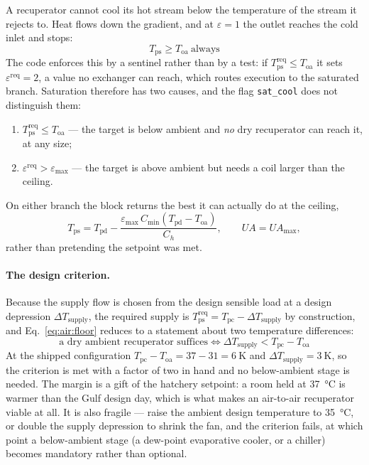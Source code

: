 \documentclass[11pt]{article}
\providecommand{\celsius}{\degreeCelsius}
\newcommand{\UA}{\ensuremath{U\!A}}
\begin{document}
A recuperator cannot cool its hot stream below the temperature of the stream it
rejects to. Heat flows down the gradient, and at $\varepsilon=1$ the outlet
reaches the cold inlet and stops:
\begin{equation}
\boxed{\;T_{\mathrm{ps}} \ge T_{\mathrm{oa}}\ \text{always}\;}
\label{eq:air:floor}
\end{equation}
The code enforces this by a sentinel rather than by a test: if
$T_{\mathrm{ps}}^{\mathrm{req}}\le T_{\mathrm{oa}}$ it sets
$\varepsilon^{\mathrm{req}}=2$, a value no exchanger can reach, which routes
execution to the saturated branch. Saturation therefore has two causes, and the
flag \texttt{sat\_cool} does not distinguish them:
\begin{enumerate}[nosep]
\item $T_{\mathrm{ps}}^{\mathrm{req}}\le T_{\mathrm{oa}}$ --- the target is
below ambient and \emph{no} dry recuperator can reach it, at any size;
\item $\varepsilon^{\mathrm{req}}>\varepsilon_{\max}$ --- the target is above
ambient but needs a coil larger than the ceiling.
\end{enumerate}
On either branch the block returns the best it can actually do at the ceiling,
\begin{equation}
T_{\mathrm{ps}} = T_{\mathrm{pd}}
- \frac{\varepsilon_{\max}\,C_{\min}\left(T_{\mathrm{pd}}-T_{\mathrm{oa}}\right)}
       {C_h},
\qquad \UA = \UA_{\max},
\label{eq:air:coolsat}
\end{equation}
rather than pretending the setpoint was met.

\paragraph{The design criterion.} Because the supply flow is chosen from the
design sensible load at a design depression $\Delta T_{\mathrm{supply}}$, the
required supply is $T_{\mathrm{ps}}^{\mathrm{req}} = T_{\mathrm{pc}} -
\Delta T_{\mathrm{supply}}$ by construction, and Eq.~\eqref{eq:air:floor}
reduces to a statement about two temperature differences:
\begin{equation}
\boxed{\;
\text{a dry ambient recuperator suffices}
\iff
\Delta T_{\mathrm{supply}} < T_{\mathrm{pc}} - T_{\mathrm{oa}}
\;}
\label{eq:air:coolercrit}
\end{equation}
At the shipped configuration $T_{\mathrm{pc}}-T_{\mathrm{oa}} =
37-31 = \SI{6}{\kelvin}$ and $\Delta T_{\mathrm{supply}}=\SI{3}{\kelvin}$, so
the criterion is met with a factor of two in hand and no below-ambient stage is
needed. The margin is a gift of the hatchery setpoint: a room held at
\SI{37}{\celsius} is warmer than the Gulf design day, which is what makes an
air-to-air recuperator viable at all. It is also fragile --- raise the ambient
design temperature to \SI{35}{\celsius}, or double the supply depression to
shrink the fan, and the criterion fails, at which point a below-ambient stage
(a dew-point evaporative cooler, or a chiller) becomes mandatory rather than
optional.
\end{document}

